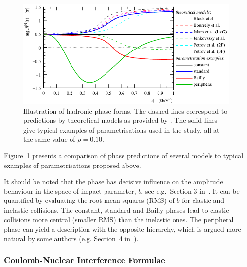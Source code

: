 \begin{figure}
\begin{center}
\includegraphics{fig/hadronic_phase_illustration.pdf}
\caption{Illustration of hadronic-phase forms. The dashed lines correspond to predictions by theoretical models as provided by \cite{elegent}. The solid lines give typical examples of parametrisations used in the study, all at the same value of $\rho = 0.10$.
}
\label{fig:phase illustration}
\end{center}
\end{figure}

Figure~\ref{fig:phase illustration} presents a comparison of phase predictions of several models to typical examples of parametrisations proposed above.

It should be noted that the phase has decisive influence on the amplitude behaviour in the space of impact parameter, $b$, see e.g.~Section 3 in~\cite{klk02}. It can be quantified by evaluating the root-mean-squares (RMS) of $b$ for elastic and inelastic collisions. The constant, standard and Bailly phases lead to elastic collisions more central (smaller RMS) than the inelastic ones. The peripheral phase can yield a description with the opposite hierarchy, which is argued more natural by some authors (e.g. Section~4 in~\cite{kl96}).

\subsubsection{Coulomb-Nuclear Interference Formulae}
\label{sec:cni interference}

